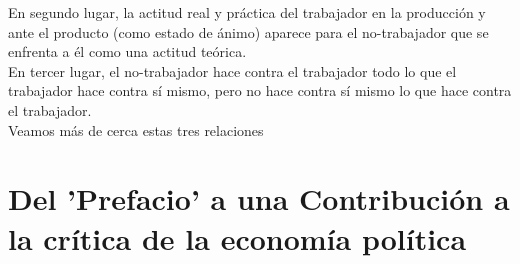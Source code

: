 En segundo lugar, la actitud real y práctica del trabajador en la producción y ante el producto (como estado de ánimo) aparece para el no-trabajador que se enfrenta a él como una actitud teórica. \\

En tercer lugar, el no-trabajador hace contra el trabajador todo lo que el trabajador hace contra sí mismo, pero no hace contra sí mismo lo que hace contra el trabajador.\\

Veamos más de cerca estas tres relaciones

\section{Del 'Prefacio' a una Contribución a la crítica de la economía política}








